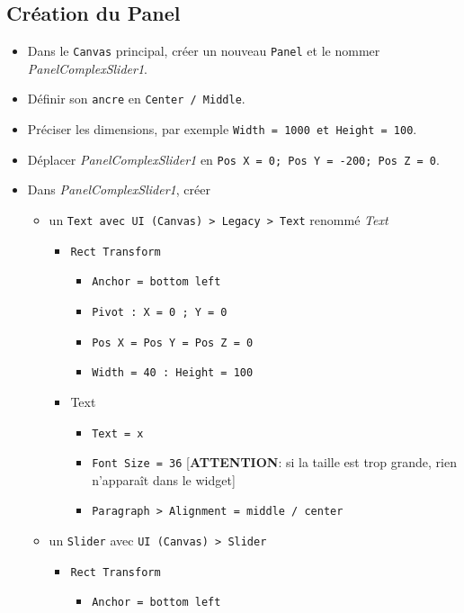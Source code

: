 \documentclass[a4paper,10pt]{article}
\newenvironment{solution}%
{\begin{tcolorbox}[breakable,colback=red!5!white,colframe=red!75!black,title=Solution]}%
{\end{tcolorbox}}
\begin{document}
\ifversionenseignant
\begin{solution}
\subsection{Création du Panel}
\begin{itemize}
	\item Dans le \texttt{Canvas} principal, créer un nouveau \texttt{Panel} et le nommer \textit{PanelComplexSlider1}. 
	\item Définir son \texttt{ancre} en \texttt{Center / Middle}.
	\item  Préciser les dimensions, par exemple \texttt{Width = 1000 et Height = 100}. \item Déplacer \textit{PanelComplexSlider1} en \texttt{Pos X = 0; Pos Y = -200; Pos Z = 0}.	
	\item Dans \textit{PanelComplexSlider1}, créer
	\begin{itemize}
		\item un  \texttt{Text avec UI (Canvas) > Legacy > Text} renommé \textit{Text}
		\begin{itemize}
			\item \texttt{Rect Transform}
			\begin{itemize}
				\item \texttt{Anchor = bottom left}
				\item \texttt{Pivot : X = 0 ; Y = 0}
				\item \texttt{Pos X = Pos Y = Pos Z = 0}
				\item \texttt{Width = 40 : Height = 100}				
			\end{itemize}
		    \item Text
		    \begin{itemize}
		    	\item \texttt{Text = x}
		    	\item \texttt{Font Size = 36} [\textbf{ATTENTION}: si la taille est trop grande, rien n'apparaît dans le widget]
		    	\item \texttt{Paragraph > Alignment = middle / center}
		    \end{itemize}
		\end{itemize}
		\item un \texttt{Slider} avec \texttt{UI (Canvas) > Slider}
		\begin{itemize}
			\item \texttt{Rect Transform}
			\begin{itemize}
				\item \texttt{Anchor = bottom left}

\end{itemize}
\end{itemize}
\end{itemize}
\end{itemize}
\end{solution}
\end{document}
